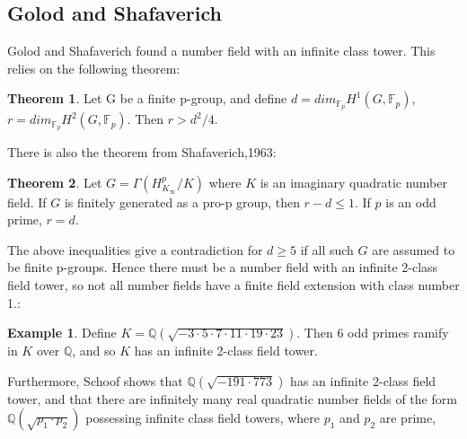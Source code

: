 \documentclass[12pt]{extarticle}
\newcommand{\Q}{\mathbb{Q}}
\newcommand{\<}{\langle}
\renewcommand{\>}{\rangle}
\theoremstyle{definition}
\newtheorem{theorem}{Theorem}
\newtheorem*{example}{Example}
\begin{document}
\subsection{Golod and Shafaverich}
Golod and Shafaverich \cite{GOLO} found a number field with an infinite class tower. This relies on the following theorem:

\begin{theorem}
    Let G be a finite p-group, and define $d=dim_{\mathbb{F}_{p}}H^1(G,\mathbb{F}_p)$, $r=dim_{\mathbb{F}_{p}}H^2(G,\mathbb{F}_p)$. 
    Then $r>d^2/4$.
\end{theorem}
There is also the theorem from Shafaverich,1963:

\begin{theorem}
    Let $G = \Gamma(H_{K_{\infty}}^{p}/K)$ where $K$ is an imaginary quadratic number field. If $G$ is finitely generated as a pro-p group, then
$r-d\leq 1 $. If $p$ is an odd prime, $r=d$.
\end{theorem}
The above inequalities give a contradiction for $d \geq 5$ if all such $G$ are assumed to be finite p-groups. Hence there must be a number field with an infinite 2-class field tower, so not all number fields have a finite field extension with class number 1.:
\begin{example}
    Define $K=\Q(\sqrt{-3 \cdot 5\cdot7\cdot11\cdot19\cdot23})$. Then 6 odd primes ramify in $K$ over $\Q$, and so $K$ has an infinite 2-class field tower. 
\end{example}
Furthermore, Schoof \cite{SCHO} shows that $\Q\left(\sqrt{-191\cdot773}\right)$ has an infinite 2-class field tower, and that there are infinitely many real quadratic number fields of the form $\Q(\sqrt{p_1 \cdot p_2})$ possessing infinite class field towers, where $p_1$ and $p_2$ are prime, 
\end{document}
